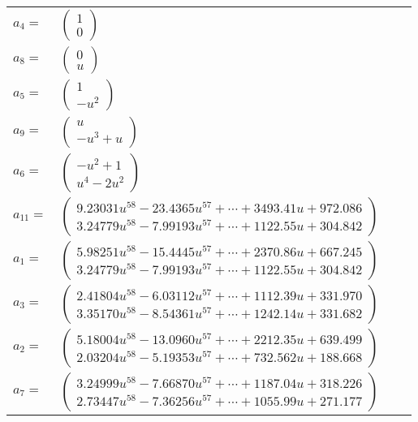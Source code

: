 \documentclass[1p]{elsarticle_modified}
\theoremstyle{definition}
\begin{document}
\begin{tabular}{m{7pt} m{180pt} m{7pt} m{180pt} }
\flushright $a_{4}=$&$\begin{pmatrix}1\\0\end{pmatrix}$ \\
\flushright $a_{8}=$&$\begin{pmatrix}0\\u\end{pmatrix}$ \\
\flushright $a_{5}=$&$\begin{pmatrix}1\\- u^2\end{pmatrix}$ \\
\flushright $a_{9}=$&$\begin{pmatrix}u\\- u^3+u\end{pmatrix}$ \\
\flushright $a_{6}=$&$\begin{pmatrix}- u^2+1\\u^4-2 u^2\end{pmatrix}$ \\
\flushright $a_{11}=$&$\begin{pmatrix}9.23031 u^{58}-23.4365 u^{57}+\cdots+3493.41 u+972.086\\3.24779 u^{58}-7.99193 u^{57}+\cdots+1122.55 u+304.842\end{pmatrix}$ \\
\flushright $a_{1}=$&$\begin{pmatrix}5.98251 u^{58}-15.4445 u^{57}+\cdots+2370.86 u+667.245\\3.24779 u^{58}-7.99193 u^{57}+\cdots+1122.55 u+304.842\end{pmatrix}$ \\
\flushright $a_{3}=$&$\begin{pmatrix}2.41804 u^{58}-6.03112 u^{57}+\cdots+1112.39 u+331.970\\3.35170 u^{58}-8.54361 u^{57}+\cdots+1242.14 u+331.682\end{pmatrix}$ \\
\flushright $a_{2}=$&$\begin{pmatrix}5.18004 u^{58}-13.0960 u^{57}+\cdots+2212.35 u+639.499\\2.03204 u^{58}-5.19353 u^{57}+\cdots+732.562 u+188.668\end{pmatrix}$ \\
\flushright $a_{7}=$&$\begin{pmatrix}3.24999 u^{58}-7.66870 u^{57}+\cdots+1187.04 u+318.226\\2.73447 u^{58}-7.36256 u^{57}+\cdots+1055.99 u+271.177\end{pmatrix}$ \\

\end{tabular}
\end{document}
